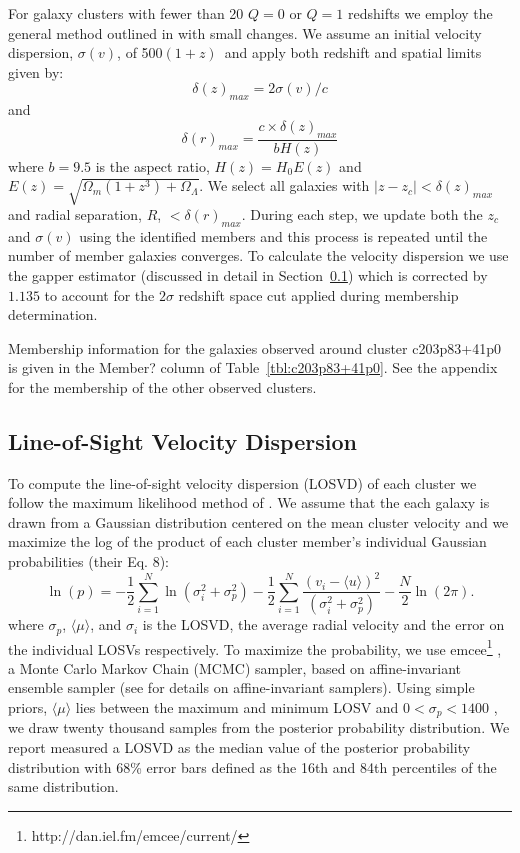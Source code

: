 For galaxy clusters with fewer than 20 $Q=0$ or $Q=1$ redshifts we employ the general method outlined in \cite{Wilman2005, Connelly2012} with small changes. We assume an initial velocity dispersion, $\sigma(v)$, of 500$(1+z)$\kms\ and apply both redshift and spatial limits given by: 
\begin{equation}
	\delta(z)_{max} = 2 \sigma(v)/c 
\end{equation}
and 
\begin{equation}
	\delta(r)_{max} = \frac{c\times\delta(z)_{max}}{bH(z)} 
\end{equation}
where $b=9.5$ is the aspect ratio, $H(z) = H_0 E(z)$ and $E(z) = \sqrt{\Omega_m(1+z^3)+\Omega_{\Lambda}}$. We select all galaxies with $|z-z_c| < \delta(z)_{max}$ and radial separation, $R$, $<\delta(r)_{max}$. During each step, we update both the $z_c$ and $\sigma(v)$ using the identified members and this process is repeated until the number of member galaxies converges. To calculate the velocity dispersion we use the gapper estimator (discussed in detail in Section~\ref{sec:LOSVD}) which is corrected by $1.135$ to account for the $2\sigma$ redshift space cut applied during membership determination. 

Membership information for the galaxies observed around cluster c203p83+41p0 is given in the Member? column of Table~\ref{tbl:c203p83+41p0}. See the appendix for the membership of the other observed clusters.

\subsection{Line-of-Sight Velocity Dispersion}\label{sec:LOSVD}
To compute the line-of-sight velocity dispersion (LOSVD) of each cluster we follow the maximum likelihood method of \cite{Walker2006}. We assume that the each galaxy is drawn from a Gaussian distribution centered on the mean cluster velocity and we maximize the log of the product of each cluster member's individual Gaussian probabilities (their Eq. 8):
\begin{equation}
  \label{eq:log}
\ln(p)=-\frac{1}{2}\sum_{i=1}^{N}\ln(\sigma_i^2+\sigma_p^2)-\frac{1}{2}\sum_{i=1}^N\frac{(v_i-\langle u \rangle)^2}{(\sigma_i^2+\sigma_p^2)}-\frac{N}{2}\ln(2\pi).
\end{equation}
where $\sigma_p$, $\langle\mu\rangle$, and $\sigma_i$ is the LOSVD, the average radial velocity and the error on the individual LOSVs respectively. To maximize the probability, we use {\sc emcee}\footnote{http://dan.iel.fm/emcee/current/} \citep{Foreman-Mackey2013}, a Monte Carlo Markov Chain (MCMC) sampler, based on affine-invariant ensemble sampler (see \citealt{Goodman2010} for details on affine-invariant samplers). Using simple priors, $\langle\mu\rangle$ lies between the maximum and minimum LOSV and $0< \sigma_p < 1400$ \kms, we draw twenty thousand samples from the posterior probability distribution. We report measured a LOSVD as the median value of the posterior probability distribution with 68\% error bars defined as the 16th and 84th percentiles of the same distribution.

